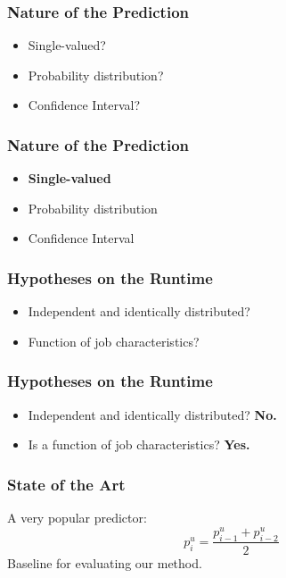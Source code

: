 \documentclass{beamer}
\begin{document}
\begin{frame}
  \frametitle{Nature of the Prediction}
\begin{itemize}
  \item Single-valued?
  \item Probability distribution?
  \item Confidence Interval?
\end{itemize}
\end{frame}

\begin{frame}
  \frametitle{Nature of the Prediction}
\begin{itemize}
  \item \textbf{Single-valued}
  \item Probability distribution
  \item Confidence Interval
\end{itemize}
\end{frame}

\begin{frame}
  \frametitle{Hypotheses on the Runtime}
  \begin{itemize}
    \item Independent and identically distributed?
    \item Function of job characteristics?
  \end{itemize}
\end{frame}

\begin{frame}
  \frametitle{Hypotheses on the Runtime}
  \begin{itemize}
    \item Independent and identically distributed? \textbf{No.}
    \item Is a function of job characteristics? \textbf{Yes.}
  \end{itemize}
\end{frame}


\begin{frame}
  \frametitle{State of the Art}

  \centering
  A very popular predictor:
  \[
    p_i^u =\frac{p_{i-1}^u+ p_{i-2}^u}{2}
  \]
  Baseline for evaluating our method.

\end{frame}


\end{document}
